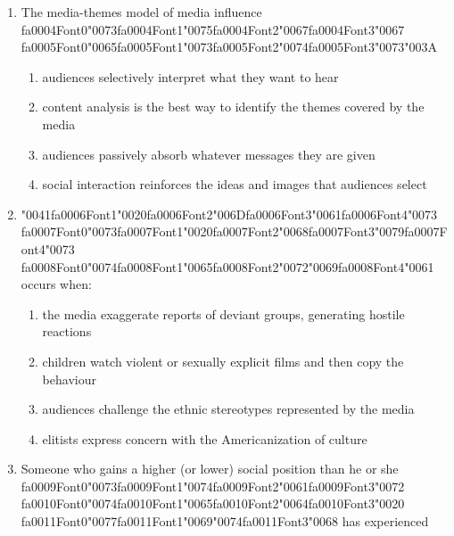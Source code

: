 \documentclass[12pt]{article}
\begin{document}
\begin{enumerate}[label=\arabic*.]
\begin{enumerate}[label=(\alph*)]
    \item both boys and girls being closely attached to their fathers, but girls breaking away
\end{enumerate}
\item The media-themes model of media influence {\csname fa0004Font0\endcsname\char"0073}{\csname fa0004Font1\endcsname\char"0075}{\csname fa0004Font2\endcsname\char"0067}{\csname fa0004Font3\endcsname\char"0067} {\csname fa0005Font0\endcsname\char"0065}{\csname fa0005Font1\endcsname\char"0073}{\csname fa0005Font2\endcsname\char"0074}{\csname fa0005Font3\endcsname\char"0073}{\char"003A}
\begin{enumerate}[label=(\alph*)]
    \item audiences selectively interpret what they want to hear
    \item content analysis is the best way to identify the themes covered by the media
    \item audiences passively absorb whatever messages they are given
    \item social interaction reinforces the ideas and images that audiences select
\end{enumerate}
\item {\char"0041}{\csname fa0006Font1\endcsname\char"0020}{\csname fa0006Font2\endcsname\char"006D}{\csname fa0006Font3\endcsname\char"0061}{\csname fa0006Font4\endcsname\char"0073} {\csname fa0007Font0\endcsname\char"0073}{\csname fa0007Font1\endcsname\char"0020}{\csname fa0007Font2\endcsname\char"0068}{\csname fa0007Font3\endcsname\char"0079}{\csname fa0007Font4\endcsname\char"0073} {\csname fa0008Font0\endcsname\char"0074}{\csname fa0008Font1\endcsname\char"0065}{\csname fa0008Font2\endcsname\char"0072}{\char"0069}{\csname fa0008Font4\endcsname\char"0061} occurs when:
\begin{enumerate}[label=(\alph*)]
    \item the media exaggerate reports of deviant groups, generating hostile reactions
    \item children watch violent or sexually explicit films and then copy the behaviour
    \item audiences challenge the ethnic stereotypes represented by the media
    \item elitists express concern with the Americanization of culture
\end{enumerate}
\item Someone who gains a higher (or lower) social position than he or she {\csname fa0009Font0\endcsname\char"0073}{\csname fa0009Font1\endcsname\char"0074}{\csname fa0009Font2\endcsname\char"0061}{\csname fa0009Font3\endcsname\char"0072} {\csname fa0010Font0\endcsname\char"0074}{\csname fa0010Font1\endcsname\char"0065}{\csname fa0010Font2\endcsname\char"0064}{\csname fa0010Font3\endcsname\char"0020} {\csname fa0011Font0\endcsname\char"0077}{\csname fa0011Font1\endcsname\char"0069}{\char"0074}{\csname fa0011Font3\endcsname\char"0068} has experienced

\end{enumerate}
\end{document}
